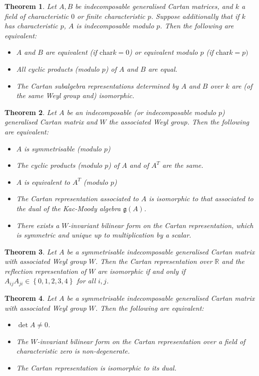 \documentclass[11pt,a4paper]{report}
\newtheorem{theorem}{Theorem}[chapter]
\theoremstyle{definition}
\begin{document}
\begin{theorem} Let $A, B$ be indecomposable generalised Cartan matrices, and $k$ a field of characteristic $0$ or finite characteristic $p$. Suppose additionally that if $k$ has characteristic $p$, $A$ is indecomposable modulo $p$. Then the following are equivalent:
\begin{itemize}
    \item $A$ and $B$ are equivalent (if $\mathrm{char} k = 0$) or equivalent modulo $p$ (if $\mathrm{char} k = p)$
    \item All cyclic products (modulo $p$) of $A$ and $B$ are equal.
    \item The Cartan subalgebra representations determined by $A$ and $B$ over $k$ are (of the same Weyl group and) isomorphic. 
\end{itemize}
\end{theorem}
\begin{theorem} Let $A$ be an indecomposable (or indecomposable modulo $p$) generalised Cartan matrix and $W$ the associated Weyl group. Then the following are equivalent:

\begin{itemize}
    \item $A$ is symmetrisable (modulo $p$)
    \item The cyclic products (modulo $p$) of $A$ and of $A^T$ are the same. 
    \item $A$ is equivalent to $A^T$ (modulo $p$)
    \item The Cartan representation associated to $A$ is isomorphic to that associated to the dual of the Kac-Moody algebra $\mathfrak{g}(A)$.
    \item There exists a $W$-invariant bilinear form on the Cartan representation, which is symmetric and unique up to multiplication by a scalar. 
    \end{itemize}
\end{theorem}

\begin{theorem}Let $A$ be a symmetrisable indecomposable generalised Cartan matrix with associated Weyl group $W$. Then the Cartan representation over $\mathbb{R}$ and the reflection representation of $W$ are isomorphic if and only if $A_{ij} A_{ji} \in \left\{0,1,2,3,4\right\}$ for all $i, j$.\end{theorem}

\begin{theorem}Let $A$ be a symmetrisable indecomposable generalised Cartan matrix with associated Weyl group $W$. Then the following are equivalent: 

\begin{itemize}
\item $\det A \neq 0$.
\item The $W$-invariant bilinear form on the Cartan representation over a field of characteristic zero is non-degenerate. 
\item The Cartan representation is isomorphic to its dual. 
\end{itemize}
\end{theorem}
\end{document}
